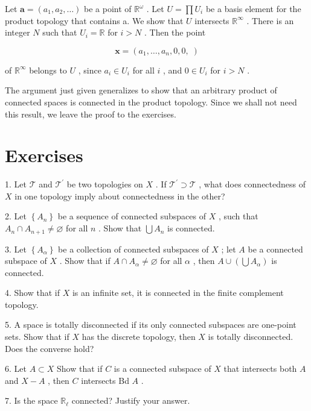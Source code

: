 \documentclass[10pt]{article}
\begin{document}
Let \(\mathbf{a} = \left( {{a}_{1},{a}_{2},\ldots }\right)\) be a point of \({\mathbb{R}}^{\omega }\) . Let \(U = \prod {U}_{i}\) be a basis element for the product topology that contains a. We show that \(U\) intersects \({\mathbb{R}}^{\infty }\) . There is an integer \(N\) such that \({U}_{i} = \mathbb{R}\) for \(i > N\) . Then the point

\[
\mathbf{x} = \left( {{a}_{1},\ldots ,{a}_{n},0,0,\;}\right)
\]

of \({\mathbb{R}}^{\infty }\) belongs to \(U\) , since \({a}_{i} \in  {U}_{i}\) for all \(i\) , and \(0 \in  {U}_{i}\) for \(i > N\) .

The argument just given generalizes to show that an arbitrary product of connected spaces is connected in the product topology. Since we shall not need this result, we leave the proof to the exercises.

\section*{Exercises}

1. Let \(\mathcal{T}\) and \({\mathcal{T}}^{\prime }\) be two topologies on \(X\) . If \({\mathcal{T}}^{\prime } \supset  \mathcal{T}\) , what does connectedness of \(X\) in one topology imply about connectedness in the other?

2. Let \(\left\{  {A}_{n}\right\}\) be a sequence of connected subspaces of \(X\) , such that \({A}_{n} \cap  {A}_{n + 1} \neq  \varnothing\) for all \(n\) . Show that \(\bigcup {A}_{n}\) is connected.

3. Let \(\left\{  {A}_{\alpha }\right\}\) be a collection of connected subspaces of \(X\) ; let \(A\) be a connected subspace of \(X\) . Show that if \(A \cap  {A}_{\alpha } \neq  \varnothing\) for all \(\alpha\) , then \(A \cup  \left( {\bigcup {A}_{\alpha }}\right)\) is connected.

4. Show that if \(X\) is an infinite set, it is connected in the finite complement topology.

5. A space is totally disconnected if its only connected subspaces are one-point sets. Show that if \(X\) has the discrete topology, then \(X\) is totally disconnected. Does the converse hold?

6. Let \(A \subset  X\) Show that if \(C\) is a connected subspace of \(X\) that intersects both \(A\) and \(X - A\) , then \(C\) intersects Bd \(A\) .

7. Is the space \({\mathbb{R}}_{\ell }\) connected? Justify your answer.
\end{document}
